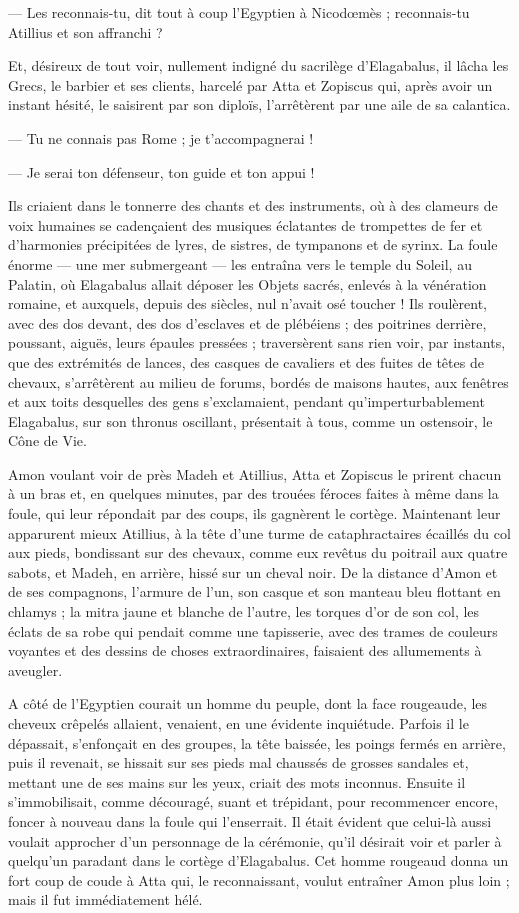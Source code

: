 \documentclass[a4paper, 11pt, oneside, polutonikogreek, french]{article}
\begin{document}
--- Les reconnais-tu, dit tout à coup l'Egyptien à Nicodœmès ; reconnais-tu Atillius et son affranchi ?

Et, désireux de tout voir, nullement indigné du sacrilège d'Elagabalus, il lâcha les Grecs, le barbier et ses clients, harcelé par Atta et Zopiscus qui, après avoir un instant hésité, le saisirent par son diploïs, l'arrêtèrent par une aile de sa calantica.

--- Tu ne connais pas Rome ; je t'accompagnerai !

--- Je serai ton défenseur, ton guide et ton appui !

Ils criaient dans le tonnerre des chants et des instruments, où à des clameurs de voix humaines se cadençaient des musiques éclatantes de trompettes de fer et d'harmonies précipitées de lyres, de sistres, de tympanons et de syrinx. La foule énorme --- une mer submergeant --- les entraîna vers le temple du Soleil, au Palatin, où Elagabalus allait déposer les Objets sacrés, enlevés à la vénération romaine, et auxquels, depuis des siècles, nul n'avait osé toucher ! Ils roulèrent, avec des dos devant, des dos d'esclaves et de plébéiens ; des poitrines derrière, poussant, aiguës, leurs épaules pressées ; traversèrent sans rien voir, par instants, que des extrémités de lances, des casques de cavaliers et des fuites de têtes de chevaux, s'arrêtèrent au milieu de forums, bordés de maisons hautes, aux fenêtres et aux toits desquelles des gens s'exclamaient, pendant qu'imperturbablement Elagabalus, sur son thronus oscillant, présentait à tous, comme un ostensoir, le Cône de Vie.

Amon voulant voir de près Madeh et Atillius, Atta et Zopiscus le prirent chacun à un bras et, en quelques minutes, par des trouées féroces faites à même dans la foule, qui leur répondait par des coups, ils gagnèrent le cortège. Maintenant leur apparurent mieux Atillius, à la tête d'une turme de cataphractaires écaillés du col aux pieds, bondissant sur des chevaux, comme eux revêtus du poitrail aux quatre sabots, et Madeh, en arrière, hissé sur un cheval noir. De la distance d'Amon et de ses compagnons, l'armure de l'un, son casque et son manteau bleu flottant en chlamys ; la mitra jaune et blanche de l'autre, les torques d'or de son col, les éclats de sa robe qui pendait comme une tapisserie, avec des trames de couleurs voyantes et des dessins de choses extraordinaires, faisaient des allumements à aveugler.

A côté de l'Egyptien courait un homme du peuple, dont la face rougeaude, les cheveux crêpelés allaient, venaient, en une évidente inquiétude. Parfois il le dépassait, s'enfonçait en des groupes, la tête baissée, les poings fermés en arrière, puis il revenait, se hissait sur ses pieds mal chaussés de grosses sandales et, mettant une de ses mains sur les yeux, criait des mots inconnus. Ensuite il s'immobilisait, comme découragé, suant et trépidant, pour recommencer encore, foncer à nouveau dans la foule qui l'enserrait. Il était évident que celui-là aussi voulait approcher d'un personnage de la cérémonie, qu'il désirait voir et parler à quelqu'un paradant dans le cortège d'Elagabalus. Cet homme rougeaud donna un fort coup de coude à Atta qui, le reconnaissant, voulut entraîner Amon plus loin ; mais il fut immédiatement hélé.
\end{document}
